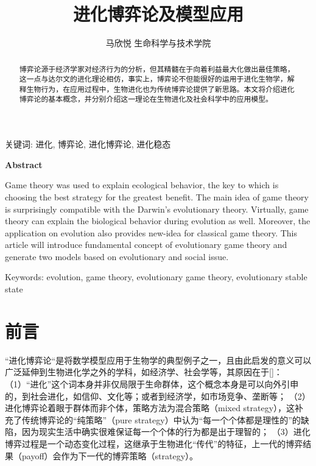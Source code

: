 \documentclass[12pt]{article}
\title{进化博弈论及模型应用}
\author{ 马欣悦 \qquad 1653515 \qquad 生命科学与技术学院}
\date{}
\begin{document}
\maketitle
\begin{Large}
	\par \qquad
\end{Large}
\begin{abstract}
\noindent 博弈论源于经济学家对经济行为的分析，但其精髓在于向着利益最大化做出最佳策略，这一点与达尔文的进化理论相仿，事实上，博弈论不但能很好的运用于进化生物学，解释生物行为，在应用过程中，生物进化也为传统博弈论提供了新思路。本文将介绍进化博弈论的基本概念，并分别介绍这一理论在生物进化及社会科学中的应用模型。
\end{abstract}

\begin{flushleft}
\qquad \quad 关键词: 进化, 博弈论, 进化博弈论, 进化稳态 
\end{flushleft}
\begin{Large}
	\par \qquad
\end{Large}

\begin{center}
	\textbf{Abstract} 
\end{center}
\begin{flushleft}
Game theory was used to explain ecological behavior, the key to which is choosing the best strategy for the greatest benefit. The main idea of game theory is surprisingly compatible with the Darwin's evolutionary theory. Virtually, game theory can explain the biological behavior during evolution as well. Moreover, the application on evolution also provides new-idea for classical game theory. This article will introduce fundamental concept of evolutionary game theory and generate two models based on evolutionary and social issue.
\end{flushleft}

\begin{flushleft}
Keywords: evolution, game theory, evolutionary game theory, evolutionary stable state 
\end{flushleft}


\newpage

\section{前言}
“进化博弈论“是将数学模型应用于生物学的典型例子之一，且由此启发的意义可以广泛延伸到生物进化学之外的学科，如经济学、社会学等，其原因在于[\cite{van2019logics}]：
（1）“进化”这个词本身并非仅局限于生命群体，这个概念本身是可以向外引申的，到社会进化，如信仰、文化等；或者到经济学，如市场竞争、垄断等；
（2）进化博弈论着眼于群体而非个体，策略方法为混合策略（mixed  strategy），这补充了传统博弈论的“纯策略”（pure strategy）中认为“每一个个体都是理性的”的缺陷，因为现实生活中确实很难保证每一个个体的行为都是出于理智的；
（3）进化博弈过程是一个动态变化过程，这继承于生物进化“传代”的特征，上一代的博弈结果（payoff）会作为下一代的博弈策略（strategy）。
\end{document}
